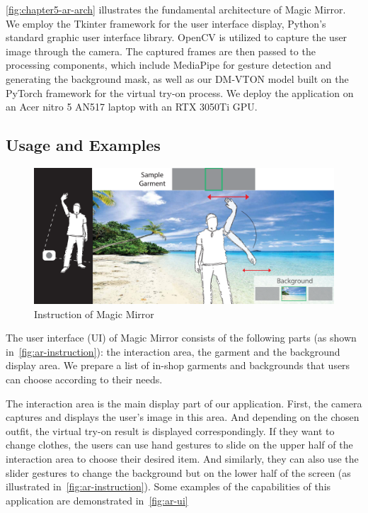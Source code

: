 \autoref{fig:chapter5-ar-arch} illustrates the fundamental architecture of Magic Mirror. We employ the Tkinter framework for the user interface display, Python's standard graphic user interface library. OpenCV is utilized to capture the user image through the camera. The captured frames are then passed to the processing components, which include MediaPipe for gesture detection and generating the background mask, as well as our DM-VTON model built on the PyTorch framework for the virtual try-on process. We deploy the application on an Acer nitro 5 AN517 laptop with an RTX 3050Ti GPU.


\subsection{Usage and Examples}
 \begin{figure}[h!]
  \centering
  \includegraphics[width=\textwidth]{content/resources/images/application/ar-instruction.pdf}
  \caption{Instruction of Magic Mirror}
  \label{fig:ar-instruction}
\end{figure}

The user interface (UI) of Magic Mirror consists of the following parts (as shown in~\autoref{fig:ar-instruction}): the interaction area, the garment and the background display area. We prepare a list of in-shop garments and backgrounds that users can choose according to their needs.

The interaction area is the main display part of our application. First, the camera captures and displays the user's image in this area. And depending on the chosen outfit, the virtual try-on result is displayed correspondingly. If they want to change clothes, the users can use hand gestures to slide on the upper half of the interaction area to choose their desired item. And similarly, they can also use the slider gestures to change the background but on the lower half of the screen (as illustrated in~\autoref{fig:ar-instruction}). Some examples of the capabilities of this application are demonstrated in~\autoref{fig:ar-ui}

